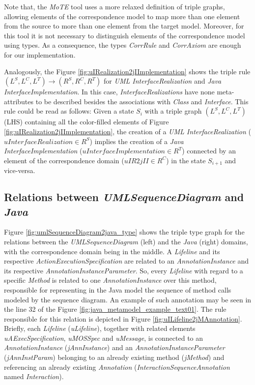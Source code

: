 \documentclass[tuberlin,cic,tc,english,noabntcite,oneside]{iiufrgs}
\begin{document}
Note that, the \emph{MoTE} tool uses a more relaxed definition of triple graphs, allowing elements of the correspondence model to map more than one element from the source to more than one element from the target model. Moreover, for this tool it is not necessary to distinguish elements of the correspondence model using types. As a consequence, the types \emph{CorrRule} and \emph{CorrAxiom} are enough for our implementation.

Analogously, the Figure \ref{fig:uIRealization2jIImplementation} shows the triple rule $(L^S,L^C,L^T) \rightarrow (R^S,R^C,R^T)$ for \emph{UML InterfaceRealization} and \emph{Java InterfaceImplementation}. In this case, \emph{InterfaceRealizations} have none meta-attributes to be described besides the associations with \emph{Class} and \emph{Interface}. This rule could be read as follows: Given a state $S_i$ with a triple graph $(L^S,L^C,L^T)$ (LHS) containing all the color-filled elements of Figure \ref{fig:uIRealization2jIImplementation}, the creation of a \emph{UML InterfaceRealization} ($uInterfaceRealization \in R^S$) implies the creation of a \emph{Java InterfaceImplementation} ($uInterfaceImplementation \in R^T$) connected by an element of the correspondence domain ($uIR2jII \in R^C$) in the state $S_{i+1}$ and vice-versa.

\subsection{Relations between \emph{UMLSequenceDiagram} and \emph{Java}}
\label{subsec:UmlSequenceDiagram2Java}
Figure \ref{fig:umlSequenceDiagram2java_type} shows the triple type graph for the relations between the \emph{UMLSequenceDiagram} (left) and the \emph{Java} (right) domains, with the correspondence domain being in the middle. A \emph{Lifeline} and its respective \emph{ActionExecutionSpecification} are related to an \emph{AnnotationInstance} and its respective \emph{AnnotationInstanceParameter}. So, every \emph{Lifeline} with regard to a specific \emph{Method} is related to one \emph{AnnotationInstance} over this method, responsible for representing in the Java model the sequence of method calls modeled by the sequence diagram. An example of such annotation may be seen in the line 32 of the Figure \ref{fig:java_metamodel_example_text01}. The rule responsible for this relation is depicted in Figure \ref{fig:uILifeline2jMAnnotation}. Briefly, each \emph{Lifeline} (\emph{uLifeline}), together with related elements \emph{uAExecSpecification}, \emph{uMOSSpec} and \emph{uMessage}, is connected to an \emph{AnnotationInstance} (\emph{jAnnInstance}) and an \emph{AnnotationInstanceParameter} (\emph{jAnnInstParam}) belonging to an already existing method (\emph{jMethod}) and referencing an already existing \emph{Annotation} (\emph{InteractionSequenceAnnotation} named \emph{Interaction}).
\end{document}
